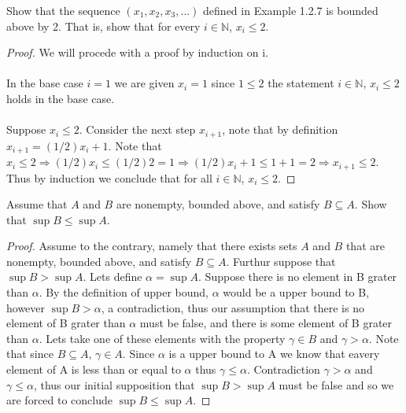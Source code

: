 \documentclass[12pt]{article}
\makeatletter
\theoremstyle{homework}
\newenvironment{exercise}[1]
{\def\@currentlabel{#1}\exercisecore}
{\endexercisecore}
\newcommand{\Nats}{\ensuremath{\mathbb N}}
\makeatother
\begin{document}
\begin{exercise}{1.2.9} Show that the sequence $(x_1, x_2, x_3,\ldots)$ defined in Example
1.2.7 is bounded above by 2.  That is, show that for every $i\in\Nats$, $x_i\le 2$.
\end{exercise}
\begin{proof}
We will procede with a proof by induction on i.\\\\
In the base case $i=1$ we are given $x_i=1$ since $1\le 2$ the statement $i\in\Nats$, $x_i\le 2$ holds in the base case.\\\\
Suppose $x_i\le 2$.  Consider the next step $x_{i+1}$, note that by definition $x_{i+1}=(1/2) x_i+1$.  Note that $x_i\le 2\Rightarrow (1/2) x_i\le (1/2) 2=1\Rightarrow (1/2) x_i+1\le 1+1=2\Rightarrow x_{i+1}\le 2$.  Thus by induction we conclude that for all $i\in\Nats$, $x_i\le 2$.
\end{proof}

\begin{exercise}{1.3.4}
Assume that $A$ and $B$ are nonempty, bounded above, and satisfy $B\subseteq A$.
Show that $\sup B \le \sup A$.
\end{exercise}
\begin{proof}
Assume to the contrary, namely that there exists sets $A$ and $B$ that are nonempty, bounded above, and satisfy $B\subseteq A$.  Furthur suppose that $\sup B > \sup A$.  Lets define $\alpha=\sup A$.  Suppose there is no element in B grater than $\alpha$.  By the definition of upper bound, $\alpha$ would be a upper bound to B, however $\sup B>\alpha$, a contradiction, thus our assumption that there is no element of B grater than $\alpha$ must be false, and there is some element of B grater than $\alpha$.  Lets take one of these elements with the property $\gamma \in B$ and $\gamma > \alpha$.  Note that since $B\subseteq A$, $\gamma \in A$.  Since $\alpha$ is a upper bound to A we know that eavery element of A is less than or equal to $\alpha$ thus $\gamma \leq \alpha$.  Contradiction $\gamma > \alpha$ and $\gamma \leq \alpha$, thus our initial supposition that $\sup B > \sup A$ must be false and so we are forced to conclude $\sup B \le \sup A$.
\end{proof}
\end{document}
